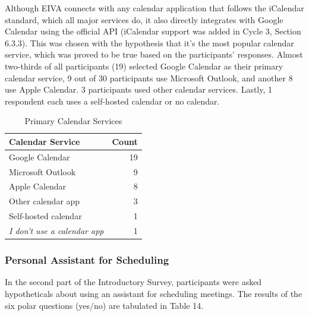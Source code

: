 \documentclass{article}
\begin{document}
Although EIVA connects with any calendar application that follows the iCalendar standard, which all major services do, it also directly integrates with Google Calendar using the official API (iCalendar support was added in Cycle 3, Section 6.3.3). This was chosen with the hypothesis that it's the most popular calendar service, which was proved to be true based on the participants' responses. Almost two-thirds of all participants (19) selected Google Calendar as their primary calendar service, 9 out of 30 participants use Microsoft Outlook, and another 8 use Apple Calendar. 3 participants used other calendar services. Lastly, 1 respondent each uses a self-hosted calendar or no calendar.

\begin{table}[!htb]
	\begin{minipage}{1\linewidth}
		\caption{Primary Calendar Services}
		\centering
		\begin{tabular}{lr}
			\hline
			\textbf{Calendar Service}         & \textbf{Count} \\
			\hline
			Google Calendar                   & 19             \\
			Microsoft Outlook                 & 9              \\
			Apple Calendar                    & 8              \\
			Other calendar app                & 3              \\
			Self-hosted calendar              & 1              \\
			\emph{I don't use a calendar app} & 1              \\
			\hline
		\end{tabular}
	\end{minipage}%
\end{table}

\subsubsection{Personal Assistant for Scheduling}

In the second part of the Introductory Survey, participants were asked hypotheticals about using an assistant for scheduling meetings. The results of the six polar questions (yes/no) are tabulated in Table 14.
\end{document}
